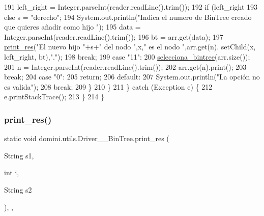 \begin{DoxyCode}
191                         left\_right = Integer.parseInt(reader.readLine().trim());
192                         \textcolor{keywordflow}{if} (left\_right%
193                         \textcolor{keywordflow}{else} s = \textcolor{stringliteral}{"derecho"};
194                         System.out.println(\textcolor{stringliteral}{"Indica el numero de BinTree creado que quieres añadir como hijo
      "});
195                         data = Integer.parseInt(reader.readLine().trim());
196                         bt = arr.get(data);
197                         \hyperlink{classdomini_1_1utils_1_1Driver____BinTree_a434e26afb3eb701558d81b0fd1c29dcb}{print\_res}(\textcolor{stringliteral}{"El nuevo hijo "}+s+\textcolor{stringliteral}{" del nodo "},x,\textcolor{stringliteral}{" es el nodo "},arr.get(n).
      setChild(x, left\_right, bt),\textcolor{stringliteral}{"."});
198                     \textcolor{keywordflow}{break};
199                     \textcolor{keywordflow}{case} \textcolor{stringliteral}{"11"}:
200                         \hyperlink{classdomini_1_1utils_1_1Driver____BinTree_a0d90bf2cb928174547e712140b5a4fe5}{selecciona\_bintree}(arr.size());
201                         n = Integer.parseInt(reader.readLine().trim());
202                         arr.get(n).print();
203                     \textcolor{keywordflow}{break};
204                     \textcolor{keywordflow}{case} \textcolor{stringliteral}{"0"}:
205                         \textcolor{keywordflow}{return};
206                     \textcolor{keywordflow}{default}:
207                         System.out.println(\textcolor{stringliteral}{"La opción no es valida"});
208                     \textcolor{keywordflow}{break};
209                 \}
210             \}
211         \} \textcolor{keywordflow}{catch} (Exception e) \{
212             e.printStackTrace();
213         \}
214     \}
\end{DoxyCode}
\mbox{\label{classdomini_1_1utils_1_1Driver____BinTree_a434e26afb3eb701558d81b0fd1c29dcb}} 
\subsubsection{\texorpdfstring{print\+\_\+res()}{print\_res()}\hspace{0.1cm}{\footnotesize\ttfamily [1/2]}}
{\footnotesize\ttfamily static void domini.\+utils.\+Driver\+\_\+\+\_\+\+Bin\+Tree.\+print\+\_\+res (\begin{DoxyParamCaption}\item[{String}]{s1,  }\item[{int}]{i,  }\item[{String}]{s2 }\end{DoxyParamCaption})\hspace{0.3cm}{\ttfamily [inline]}, {\ttfamily [static]}, {\ttfamily [private]}}


